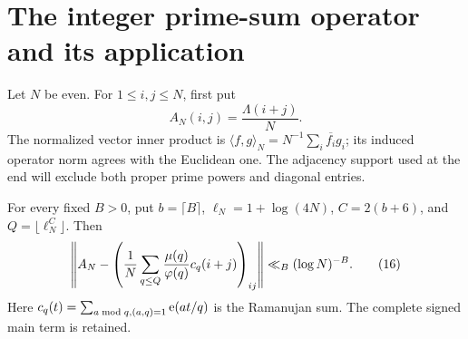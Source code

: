 \section{The integer prime-sum operator and its application}
\label{sec:primesum}
Let \(N\) be even. For \(1\leq i,j\leq N\), first put
\[
 A_N(i,j)=\frac{\Lambda(i+j)}{N}.
\]
The normalized vector inner product is
\(\langle f,g\rangle_N=N^{-1}\sum_i\overline{f_i}g_i\);
its induced operator norm agrees with the Euclidean one.
The adjacency support used at the end will exclude both
proper prime powers and diagonal entries.

\begin{lemma}
\label{lem:integertransfer}
For every fixed \(B>0\), put \(b=\lceil B\rceil\),
\(\ell_N=1+\log(4N)\), \(C=2(b+6)\), and
\(Q=\lfloor\ell_N^C\rfloor\). Then
\[
 \left\|A_N-
    \left(\frac1N\sum_{q\leq Q}
                \frac{\mu(q)}{\varphi(q)}c_q(i+j)\right)_{ij}
       \right\|\ll_B(\log N)^{-B}.                          \tag{16}
\]
Here \(c_q(t)=\sum_{a\bmod q,(a,q)=1}\mathrm e(at/q)\)
is the Ramanujan sum. The complete signed main term is retained.
\end{lemma}
